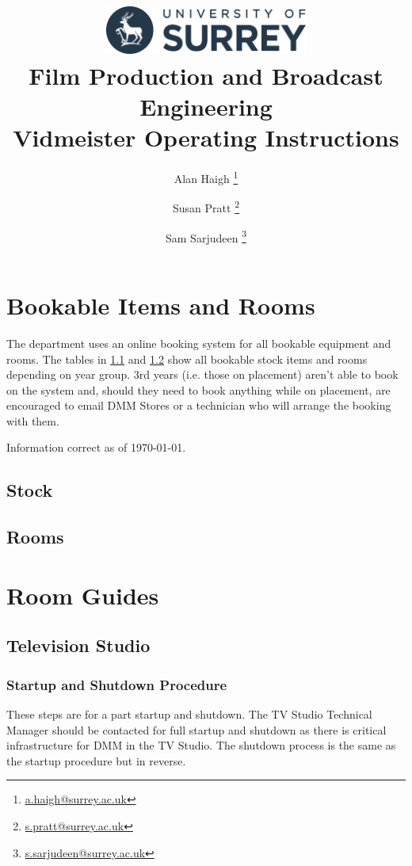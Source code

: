 \documentclass{report}
\title{
\includegraphics[width=0.5\textwidth]{uos-logo.png}\\\vspace{1cm}
Film Production and Broadcast Engineering\\Vidmeister Operating Instructions
}
\author{Alan Haigh \thanks{\href{mailto:a.haigh@surrey.ac.uk}{a.haigh@surrey.ac.uk}} \and Susan Pratt \thanks{\href{mailto:s.pratt@surrey.ac.uk}{s.pratt@surrey.ac.uk}} \and Sam Sarjudeen \thanks{\href{mailto:s.sarjudeen@surrey.ac.uk}{s.sarjudeen@surrey.ac.uk}}}
\begin{document}
\maketitle
\tableofcontents

\chapter{Bookable Items and Rooms}

The department uses an online booking system for all bookable equipment and rooms. The tables in \ref{stock} and \ref{rooms} show all bookable stock items and rooms depending on year group. 3rd years (i.e. those on placement) aren't able to book on the system and, should they need to book anything while on placement, are encouraged to email DMM Stores or a technician who will arrange the booking with them.

Information correct as of \today.

\section{Stock}\label{stock}



\newpage
\section{Rooms}\label{rooms}



\chapter{Room Guides}

\section{Television Studio}
\subsection*{Startup and Shutdown Procedure}

These steps are for a part startup and shutdown. The TV Studio Technical Manager should be contacted for full startup and shutdown as there is critical infrastructure for DMM in the TV Studio. The shutdown process is the same as the startup procedure but in reverse.
\end{document}
